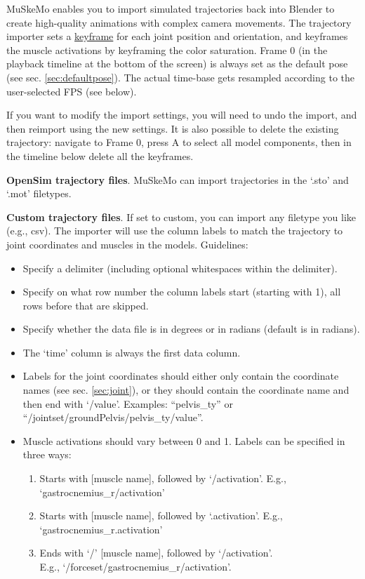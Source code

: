 \documentclass{article}
\begin{document}
MuSkeMo enables you to import simulated trajectories back into Blender to create high-quality animations with complex camera movements. The trajectory importer sets a \href{https://docs.blender.org/manual/en/latest/animation/keyframes/index.html}{keyframe} for each joint position and orientation, and keyframes the muscle activations by keyframing the color saturation. Frame 0 (in the playback timeline at the bottom of the screen) is always set as the default pose (see sec. \ref{sec:defaultpose}). The actual time-base gets resampled according to the user-selected FPS (see below).

If you want to modify the import settings, you will need to undo the import, and then reimport using the new settings. It is also possible to delete the existing trajectory: navigate to Frame 0, press A to select all model components, then in the timeline below delete all the keyframes.

\textbf{OpenSim trajectory files}. MuSkeMo can import trajectories in the `.sto' and `.mot' filetypes.


\textbf{Custom trajectory files}. If set to custom, you can import any filetype you like (e.g., csv). The importer will use the column labels to match the trajectory to joint coordinates and muscles in the models. Guidelines:
\begin{itemize}
    \item Specify a delimiter (including optional whitespaces within the delimiter).
    \item Specify on what row number the column labels start (starting with 1), all rows before that are skipped.
    \item Specify whether the data file is in degrees or in radians (default is in radians).
    \item The `time' column is always the first data column. 
    \item Labels for the joint coordinates should either only contain the coordinate names (see sec. \ref{sec:joint}), or they should contain the coordinate name and then end with `/value'. Examples: ``pelvis\_ty'' or ``/jointset/groundPelvis/pelvis\_ty/value''.
    \item Muscle activations should vary between 0 and 1. Labels can be specified in three ways:
    \begin{enumerate}
        \item Starts with [muscle name], followed by `/activation'. E.g., `gastrocnemius\_r/activation'
        \item Starts with [muscle name], followed by `.activation'. E.g., `gastrocnemius\_r.activation'
        \item Ends with `/' [muscle name], followed by `/activation'. 
        \\
        E.g., `/forceset/gastrocnemius\_r/activation'.
    \end{enumerate}
\end{itemize}
\end{document}

